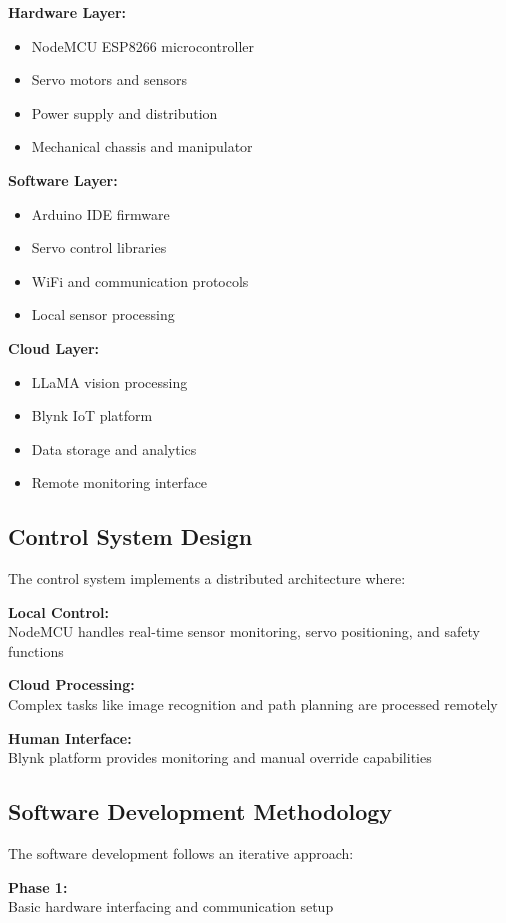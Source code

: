 \textbf{Hardware Layer:}
\begin{itemize}
\item NodeMCU ESP8266 microcontroller
\item Servo motors and sensors
\item Power supply and distribution
\item Mechanical chassis and manipulator
\end{itemize}

\textbf{Software Layer:}
\begin{itemize}
\item Arduino IDE firmware
\item Servo control libraries
\item WiFi and communication protocols
\item Local sensor processing
\end{itemize}

\textbf{Cloud Layer:}
\begin{itemize}
\item LLaMA vision processing
\item Blynk IoT platform
\item Data storage and analytics
\item Remote monitoring interface
\end{itemize}

\subsection{Control System Design}
The control system implements a distributed architecture where:

\textbf{Local Control:}
\\NodeMCU handles real-time sensor monitoring, servo positioning, and safety functions

\textbf{Cloud Processing:}
\\Complex tasks like image recognition and path planning are processed remotely

\textbf{Human Interface:}
\\Blynk platform provides monitoring and manual override capabilities

\subsection{Software Development Methodology}
The software development follows an iterative approach:

\textbf{Phase 1:}
\\Basic hardware interfacing and communication setup

